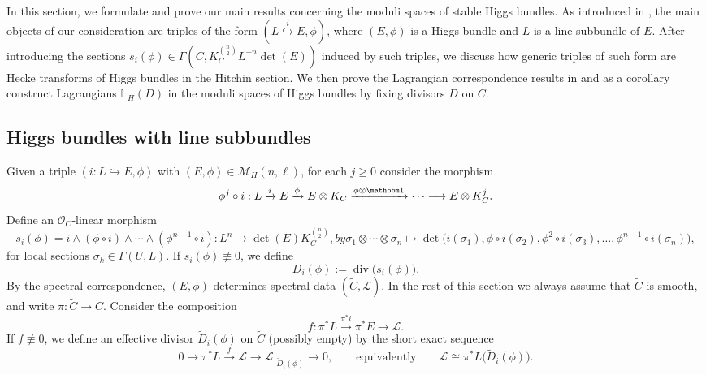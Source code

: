 \documentclass[twoside, 11pt]{article}
\numberwithin{equation}{section}
\theoremstyle{theorem}
\numberwithin{theorem}{section}
\theoremstyle{definition}
\begin{document}
In this section, we formulate and prove our main results concerning the moduli spaces of stable Higgs bundles. As introduced in , the main objects of our consideration are triples of the form $(L \overset{i}{\hookrightarrow} E, \phi)$, where $(E, \phi)$ is a Higgs bundle and $L$ is a line subbundle of $E$. 
After introducing the sections $s_i(\phi) \in \Gamma(C,K_C^{n \choose 2} L^{-n} \det(E))$ induced by such triples, we discuss how generic triples of such form are Hecke transforms of Higgs bundles in the Hitchin section. We then prove the Lagrangian correspondence results in  and as a corollary construct Lagrangians $\mathbb{L}_H(D)$ in the moduli spaces of Higgs bundles by fixing divisors $D$ on $C$.

\subsection{Higgs bundles with line subbundles}
Given a triple \((i:L\hookrightarrow E,\phi)\) with \((E,\phi)\in \mathcal M_H(n,\ell)\), for each \(j\ge 0\) consider the morphism
\[
\phi^j\circ i:L\xrightarrow{i}E\xrightarrow{\phi}E\otimes K_C\xrightarrow{\phi\otimes \mathbbm 1}\cdots \longrightarrow E\otimes K_C^j.
\]
Define an \(\mathcal O_C\)-linear morphism
\begin{subequations}\label{eqn-def-s-i-phi}
\begin{equation}
s_i(\phi)=i \wedge (\phi \circ i) \wedge \cdots \wedge (\phi^{n-1} \circ i):L^{n}\longrightarrow \det(E)K_C^{\binom{n}{2}},
\end{equation}
by
\begin{equation}
\sigma_1\otimes\cdots\otimes \sigma_n\longmapsto \det\bigl(i(\sigma_1),\phi\circ i(\sigma_2),\phi^2\circ i(\sigma_3),\dots,\phi^{n-1}\circ i(\sigma_n)\bigr),
\end{equation}
\end{subequations}
for local sections \(\sigma_k\in \Gamma(U,L)\). If \(s_i(\phi)\not\equiv 0\), we define
\[
D_i(\phi):=\operatorname{div}\bigl(s_i(\phi)\bigr).
\]
By the spectral correspondence, \((E,\phi)\) determines spectral data \((\widetilde C,\mathcal L)\). In the rest of this section we always assume that \(\widetilde C\) is smooth, and write \(\pi:\widetilde C\to C\). Consider the composition
\begin{equation}\label{eqn-composition-tilde-D}
f:\pi^*L\xrightarrow{\pi^*i}\pi^*E\longrightarrow \mathcal L.
\end{equation}
If \(f\not\equiv 0\), we define an effective divisor \(\widetilde D_i(\phi)\) on \(\widetilde C\) (possibly empty) by the short exact sequence
\begin{equation}\label{e: recons spectral line bundle}
0\to \pi^*L\xrightarrow{\,f\,}\mathcal L\to \mathcal L|_{\widetilde D_i(\phi)}\to 0,
\qquad\text{equivalently}\qquad
\mathcal L\cong \pi^*L\bigl(\widetilde D_i(\phi)\bigr).
\end{equation}
\end{document}
